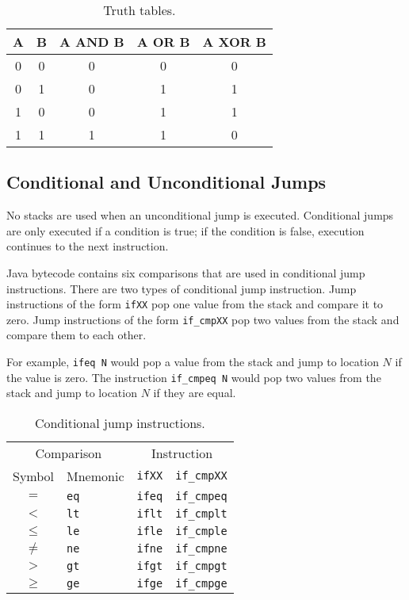 \begin{table}[htp]
  \centering
  \caption*{Truth tables.}
  \begin{tabular}{ccccc}
    \toprule
    A & B & A AND B & A OR B & A XOR B \\
    \midrule
    0 & 0 & 0 & 0 & 0 \\
    0 & 1 & 0 & 1 & 1 \\
    1 & 0 & 0 & 1 & 1 \\
    1 & 1 & 1 & 1 & 0 \\
    \bottomrule
  \end{tabular}
\end{table}

\subsection{Conditional and Unconditional Jumps}

No stacks are used when an unconditional jump is executed.
Conditional jumps are only executed if a condition is true; if the condition is false, execution continues to the next instruction.

Java bytecode contains six comparisons that are used in conditional jump instructions.
There are two types of conditional jump instruction.
Jump instructions of the form \texttt{ifXX} pop one value from the stack and compare it to zero.
Jump instructions of the form \texttt{if\_cmpXX} pop two values from the stack and compare them to each other.

For example, \texttt{ifeq N} would pop a value from the stack and jump to location \( N \) if the value is zero.
The instruction \texttt{if\_cmpeq N} would pop two values from the stack and jump to location \( N \) if they are equal.

\begin{table}[htp]
  \centering
  \caption*{Conditional jump instructions.}
  \begin{tabular}{clll}
    \toprule
    \multicolumn{2}{c}{Comparison} & \multicolumn{2}{c}{Instruction} \\
    Symbol & Mnemonic & \texttt{ifXX} & \texttt{if\_cmpXX} \\
    \midrule
    \( = \)    & \texttt{eq} & \texttt{ifeq} & \texttt{if\_cmpeq} \\
    \( < \)    & \texttt{lt} & \texttt{iflt} & \texttt{if\_cmplt} \\
    \( \leq \) & \texttt{le} & \texttt{ifle} & \texttt{if\_cmple} \\
    \( \neq \) & \texttt{ne} & \texttt{ifne} & \texttt{if\_cmpne} \\
    \( > \)    & \texttt{gt} & \texttt{ifgt} & \texttt{if\_cmpgt} \\
    \( \geq \) & \texttt{ge} & \texttt{ifge} & \texttt{if\_cmpge} \\
    \bottomrule
  \end{tabular}
\end{table}
